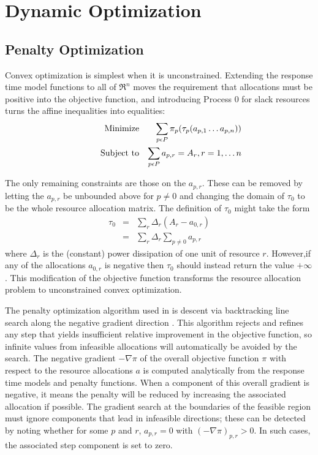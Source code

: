 \section{Dynamic Optimization}\label{dyn_opt}



\subsection*{Penalty Optimization}

Convex optimization is simplest when it is unconstrained.
Extending the response time model functions to all of $\Re^n$
moves the requirement that allocations must be positive into the objective function,
and introducing Process 0 for slack resources turns the affine inequalities into equalities:
\begin{eqnarray*}
& \makebox[1in][r]{Minimize}   & \sum_{p\epsilon P} {\pi_p(\tau_p(a_{p,1}\ldots a_{p,n}))}  \\
& \makebox[1in][r]{Subject to} & \sum_{p\epsilon P} a_{p,r} = A_r, r = 1,\ldots n           \\
\end{eqnarray*}

The only remaining constraints are those on the $a_{p,r}$.
These can be removed by letting the $a_{p,r}$ be unbounded above for $p \neq 0$
and changing the domain of $\tau_0$  to be the whole resource allocation matrix.
The definition of $\tau_0$ might take the form
\begin{eqnarray*}
\tau_0 &=& \sum_r \Delta_r (A_r - a_{0,r})     \\
       &=& \sum_r \Delta_r \sum_{p \neq 0} a_{p,r}
\end{eqnarray*}
where $\Delta_r$ is the (constant) power dissipation of one unit of resource $r$.
However,if any of the allocations $a_{0,r}$ is negative then $\tau_0$  should instead return the value $+\infty$.
This modification of the objective function transforms the resource allocation problem
to unconstrained convex optimization.

The penalty optimization algorithm used in \pacora is descent via backtracking line search along the negative gradient direction \cite{BoVa}.
This algorithm rejects and refines any step that yields insufficient relative improvement in the objective function,
so infinite values from infeasible allocations will automatically be avoided by the search.
The negative gradient $-\nabla\pi$ of the overall objective function $\pi$
with respect to the resource allocations $a$
is computed analytically from the response time models and penalty functions.
When a component of this overall gradient is negative,
it means the penalty will be reduced by increasing the associated allocation if possible.
The gradient search at the boundaries of the feasible region
must ignore components that lead in infeasible directions;
these can be detected by noting whether for some $p$ and $r$, $a_{p,r} = 0$ with $(-\nabla\pi)_{p,r} > 0$.
In such cases, the associated step component is set to zero.

